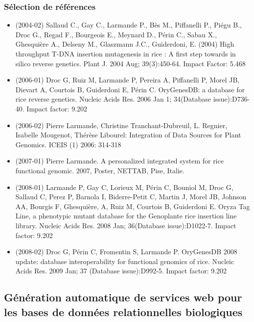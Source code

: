 \subsubsection*{Sélection de références}

\begin{itemize}

\item (2004-02) Sallaud C., Gay C., Larmande P., Bès M., Piffanelli P., Piégu B., Droc G., Regad F., Bourgeois E., Meynard D., Périn C., Sabau X., Ghesquière A., Delseny M., Glaszmann J.C., Guiderdoni, E. (2004) High throughput T-DNA insertion mutagenesis in rice : A first step towards in silico reverse genetics. Plant J. 2004 Aug; 39(3):450-64. Impact Factor: 5.468      
\item (2006-01) Droc G, Ruiz M, Larmande P, Pereira A, Piffanelli P, Morel JB, Dievart A, Courtois B, Guiderdoni E, Périn C. OryGenesDB: a database for rice reverse genetics. Nucleic Acids Res. 2006 Jan 1; 34(Database issue):D736-40. Impact factor: 9.202
\item (2006-02) Pierre Larmande, Christine Tranchant-Dubreuil, L. Regnier, Isabelle Mougenot, Thérèse Libourel:
Integration of Data Sources for Plant Genomics. ICEIS (1) 2006: 314-318
\item (2007-01) Pierre Larmande. A personalized integrated system for rice functional genomic. 2007, Poster, NETTAB, Pise, Italie.
\item (2008-01) Larmande P, Gay C, Lorieux M, Périn C, Bouniol M, Droc G, Sallaud C, Perez P, Barnola I, Biderre-Petit C, Martin J, Morel JB, Johnson AA, Bourgis F, Ghesquière, A, Ruiz M, Courtois B, Guiderdoni E. Oryza Tag Line, a phenotypic mutant database for the Genoplante rice insertion line library. Nucleic Acids Res. 2008 Jan; 36(Database issue):D1022-7. Impact factor: 9.202 
\item (2008-02) Droc G, Périn C, Fromentin S, Larmande P. OryGenesDB 2008 update: database interoperability for functional genomics of rice. Nucleic Acids Res. 2009 Jan; 37 (Database issue):D992-5. Impact factor: 9.202

\end{itemize}

\subsection*{Génération automatique de services web pour les bases de données relationnelles biologiques}
\label{SWS}

